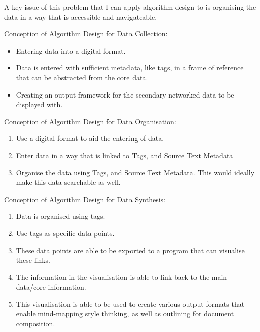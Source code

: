 \documentclass{article}
\begin{document}
A key issue of this problem that I can apply algorithm design to is organising the data in a way that is accessible and navigateable.

Conception of Algorithm Design for Data Collection:
\begin{itemize}
    \item Entering data into a digital format.
    \item Data is entered with sufficient metadata, like tags, in a frame of reference that can be abstracted from the core data.
    \item Creating an output framework for the secondary networked data to be displayed with.
\end{itemize}

Conception of Algorithm Design for Data Organisation:
\begin{enumerate}
    \item Use a digital format to aid the entering of data. 
    \item Enter data in a way that is linked to Tags, and Source Text Metadata
    \item Organise the data using Tags, and Source Text Metadata. This would ideally make this data searchable as well.
\end{enumerate}

Conception of Algorithm Design for Data Synthesis:
\begin{enumerate}
    \item Data is organised using tags.
    \item Use tags as specific data points.
    \item These data points are able to be exported to a program that can visualise these links.
    \item The information in the visualisation is able to link back to the main data/core information.
    \item This visualisation is able to be used to create various output formats that enable mind-mapping style thinking, as well as outlining for document composition.
\end{enumerate}
\end{document}
